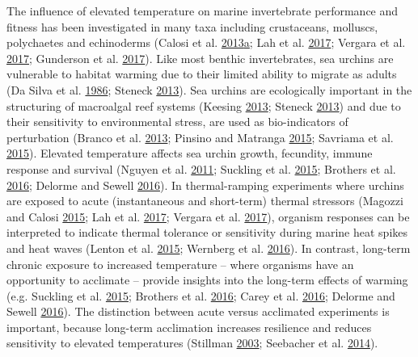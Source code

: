 \documentclass[a4paper,10pt, oneside]{memoir}
\begin{document}
The influence of elevated temperature on marine invertebrate performance and fitness has been investigated in many taxa including crustaceans, molluscs, polychaetes and echinoderms (Calosi et al. \protect\hyperlink{ref-Calosi2013}{2013}\protect\hyperlink{ref-Calosi2013}{a}; Lah et al. \protect\hyperlink{ref-Lah2017}{2017}; Vergara et al. \protect\hyperlink{ref-Vergara2017}{2017}; Gunderson et al. \protect\hyperlink{ref-Gunderson2017}{2017}).
Like most benthic invertebrates, sea urchins are vulnerable to habitat warming due to their limited ability to migrate as adults (Da Silva et al. \protect\hyperlink{ref-DaSilva1986}{1986}; Steneck \protect\hyperlink{ref-Steneck2013}{2013}).
Sea urchins are ecologically important in the structuring of macroalgal reef systems (Keesing \protect\hyperlink{ref-Keesing2013}{2013}; Steneck \protect\hyperlink{ref-Steneck2013}{2013}) and due to their sensitivity to environmental stress, are used as bio-indicators of perturbation (Branco et al. \protect\hyperlink{ref-Branco2013}{2013}; Pinsino and Matranga \protect\hyperlink{ref-Pinsino2015}{2015}; Savriama et al. \protect\hyperlink{ref-Savriama2015}{2015}).
Elevated temperature affects sea urchin growth, fecundity, immune response and survival (Nguyen et al. \protect\hyperlink{ref-Nguyen2011}{2011}; Suckling et al. \protect\hyperlink{ref-Suckling2015}{2015}; Brothers et al. \protect\hyperlink{ref-Brothers2016}{2016}; Delorme and Sewell \protect\hyperlink{ref-Delorme2016}{2016}).
In thermal-ramping experiments where urchins are exposed to acute (instantaneous and short-term) thermal stressors (Magozzi and Calosi \protect\hyperlink{ref-Magozzi2015}{2015}; Lah et al. \protect\hyperlink{ref-Lah2017}{2017}; Vergara et al. \protect\hyperlink{ref-Vergara2017}{2017}), organism responses can be interpreted to indicate thermal tolerance or sensitivity during marine heat spikes and heat waves (Lenton et al. \protect\hyperlink{ref-Lenton2015}{2015}; Wernberg et al. \protect\hyperlink{ref-Wernberg2016}{2016}).
In contrast, long-term chronic exposure to increased temperature -- where organisms have an opportunity to acclimate -- provide insights into the long-term effects of warming (e.g. Suckling et al. \protect\hyperlink{ref-Suckling2015}{2015}; Brothers et al. \protect\hyperlink{ref-Brothers2016}{2016}; Carey et al. \protect\hyperlink{ref-Carey2016}{2016}; Delorme and Sewell \protect\hyperlink{ref-Delorme2016}{2016}).
The distinction between acute versus acclimated experiments is important, because long-term acclimation increases resilience and reduces sensitivity to elevated temperatures (Stillman \protect\hyperlink{ref-Stillman2003}{2003}; Seebacher et al. \protect\hyperlink{ref-Seebacher2014}{2014}).
\end{document}
